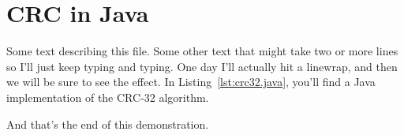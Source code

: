 \section{CRC in Java}
Some text describing this file.  Some other text that might take two or more 
lines so I'll just keep typing and typing.  One day I'll actually hit a 
linewrap, and then we will be sure to see the effect. In Listing~\ref{lst:crc32.java},
you'll find a Java implementation of the CRC-32 algorithm.


And that's the end of this demonstration.
